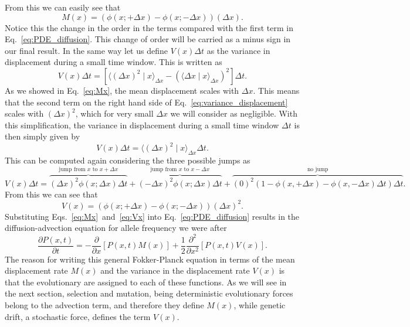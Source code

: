 From this we can easily see that
\begin{equation}
    M(x) = \left(\phi(x; + \Delta x) - \phi(x; - \Delta x) \right) (\Delta x).
\end{equation}
Notice this the change in the order in the terms compared with the first term in
Eq.~\ref{eq:PDE_diffusion}. This change of order will be carried as a minus sign
in our final result. In the same way let us define $V(x)\Delta t$ as the
variance in displacement during a small time window. This is written as
\begin{equation}
    V(x)\Delta t = \left[\langle (\Delta x)^2 \mid x \rangle_{\Delta x}
    - \left(\langle \Delta x \mid x \rangle_{\Delta x}\right)^2\right]\Delta t.
\end{equation}
As we showed in Eq.~\ref{eq:Mx}, the mean displacement scales with $\Delta x$.
This means that the second term on the right hand side of
Eq.~\ref{eq:variance_displacement} scales with $(\Delta x)^2$, which for very
small $\Delta x$ we will consider as negligible. With this simplification, the
variance in displacement during a small time window $\Delta t$ is then simply
given by
\begin{equation}
    V(x)\Delta t = \langle (\Delta x)^2 \mid x \rangle_{\Delta x} \Delta t.
\label{eq:variance_displacement}
\end{equation}
This can be computed again considering the three possible jumps as
\begin{equation}
    V(x)\Delta t = 
    \overbrace{(\Delta x)^2 \phi(x; \Delta x)\Delta t}
    ^{\text{jump from $x$ to $x + \Delta x$}}
    + \overbrace{(-\Delta x)^2 \phi(x; \Delta x)\Delta t}
    ^{\text{jump from $x$ to $x - \Delta x$}}
    + \overbrace{(0)^2 (1 - \phi(x, + \Delta x) - \phi(x, - \Delta x)\Delta t)
    \Delta t}
    ^{\text{no jump}}.
\end{equation}
From this we can see that 
\begin{equation}
    V(x) = \left(\phi(x; + \Delta x) - \phi(x; - \Delta x)\right) (\Delta x)^2.
\label{eq:Vx}
\end{equation}
Substituting Eqs.~\ref{eq:Mx}~and~\ref{eq:Vx} into Eq.~\ref{eq:PDE_diffusion} 
results in the diffusion-advection equation for allele frequency we were after
\begin{equation}
    \frac{\partial P(x, t)}{\partial t} = 
    - \frac{\partial}{\partial x}\left[ P(x, t) M(x) \right]
    + \frac{1}{2}\frac{\partial^2}{\partial x^2}\left[ P(x, t) V(x) \right].
\end{equation}
The reason for writing this general Fokker-Planck equation in terms of the mean
displacement rate $M(x)$ and the variance in the displacement rate $V(x)$ is
that the evolutionary are assigned to each of these functions. As we will see in
the next section, selection and mutation, being deterministic evolutionary
forces belong to the advection term, and therefore they define $M(x)$, while
genetic drift, a stochastic force, defines the term $V(x)$.